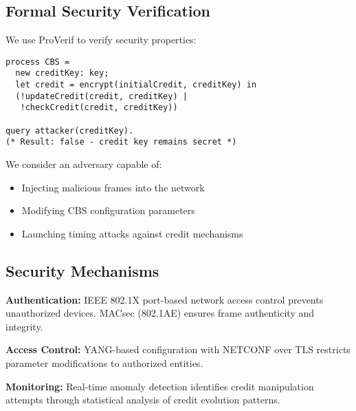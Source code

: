 \documentclass[10pt, journal, compsoc]{IEEEtran}
\begin{document}
\subsection{Formal Security Verification}

We use ProVerif to verify security properties:

\begin{verbatim}
process CBS =
  new creditKey: key;
  let credit = encrypt(initialCredit, creditKey) in
  (!updateCredit(credit, creditKey) |
   !checkCredit(credit, creditKey))
   
query attacker(creditKey).
(* Result: false - credit key remains secret *)
\end{verbatim}

We consider an adversary capable of:
\begin{itemize}
    \item Injecting malicious frames into the network
    \item Modifying CBS configuration parameters
    \item Launching timing attacks against credit mechanisms
\end{itemize}

\subsection{Security Mechanisms}

\textbf{Authentication:} IEEE 802.1X port-based network access control prevents unauthorized devices. MACsec (802.1AE) ensures frame authenticity and integrity.

\textbf{Access Control:} YANG-based configuration with NETCONF over TLS restricts parameter modifications to authorized entities.

\textbf{Monitoring:} Real-time anomaly detection identifies credit manipulation attempts through statistical analysis of credit evolution patterns.
\end{document}
